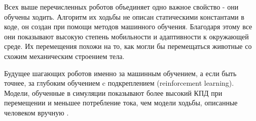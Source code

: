 Всех выше перечисленных роботов объединяет одно важное свойство - они обучены ходить. Алгоритм их ходьбы не описан статическими константами в коде, он создан при помощи методов машинного обучения. Благодаря этому все они показывают высокую степень мобильности и адаптивности к окружающей среде. Их перемещения похожи на то, как могли бы перемещаться животные со схожим механическим строением тела.

Будущее шагающих роботов именно за машинным обучением, а если быть точнее, за глубоким обучением c подкреплением \cite{Hwangbo2019} (reinforcement learning). Модели, обученные в симуляции показывают более высокий КПД при перемещении и меньшее потребление тока, чем модели ходьбы, описанные человеком вручную \cite{Hwangbo2019}. 